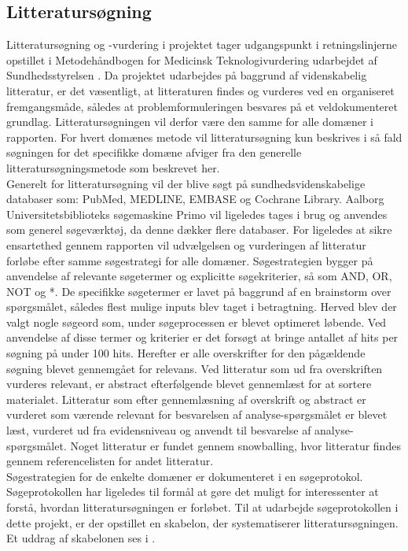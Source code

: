 \subsection{Litteratursøgning} \label{litteratursogning}
Litteratursøgning og -vurdering i projektet tager udgangspunkt i retningslinjerne opstillet i Metodehåndbogen for Medicinsk Teknologivurdering udarbejdet af Sundhedsstyrelsen \citep{metodehaandbogen}. Da projektet udarbejdes på baggrund af videnskabelig litteratur, er det væsentligt, at litteraturen findes og vurderes ved en organiseret fremgangsmåde, således at problemformuleringen besvares på et veldokumenteret grundlag. Litteratursøgningen vil derfor være den samme for alle domæner i rapporten. For hvert domænes metode vil litteratursøgning kun beskrives i så fald søgningen for det specifikke domæne afviger fra den generelle litteratursøgningsmetode som beskrevet her. \\
Generelt for litteratursøgning vil der blive søgt på sundhedsvidenskabelige databaser som: PubMed, MEDLINE, EMBASE og Cochrane Library. Aalborg Universitetsbiblioteks søgemaskine Primo vil ligeledes tages i brug og anvendes som generel søgeværktøj, da denne dækker flere databaser. For ligeledes at sikre ensartethed gennem rapporten vil udvælgelsen og vurderingen af litteratur forløbe efter samme søgestrategi for alle domæner. Søgestrategien bygger på anvendelse af relevante søgetermer og explicitte søgekriterier, så som AND, OR, NOT og *.  De specifikke søgetermer er lavet på baggrund af en brainstorm over spørgsmålet, således flest mulige inputs blev taget i betragtning. Herved blev der valgt nogle søgeord som, under søgeprocessen er blevet optimeret løbende. Ved anvendelse af disse termer og kriterier er det forsøgt at bringe antallet af hits per søgning på under 100 hits. Herefter er alle overskrifter for den pågældende søgning blevet gennemgået for relevans. Ved litteratur som ud fra overskriften vurderes relevant, er abstract efterfølgende blevet gennemlæst for at sortere materialet. Litteratur som efter gennemlæsning af overskrift og abstract er vurderet som værende relevant for besvarelsen af analyse-spørgsmålet er blevet læst, vurderet ud fra evidensniveau og anvendt til besvarelse af analyse-spørgsmålet. Noget litteratur er fundet gennem snowballing, hvor litteratur findes gennem referencelisten for andet litteratur. \\ 
Søgestrategien for de enkelte domæner er dokumenteret i en søgeprotokol. Søgeprotokollen har ligeledes til formål at gøre det muligt for interessenter at forstå, hvordan litteratursøgningen er forløbet. \citep{metodehaandbogen} Til at udarbejde søgeprotokollen i dette projekt, er der opstillet en skabelon, der systematiserer litteratursøgningen. Et uddrag af skabelonen ses i .

